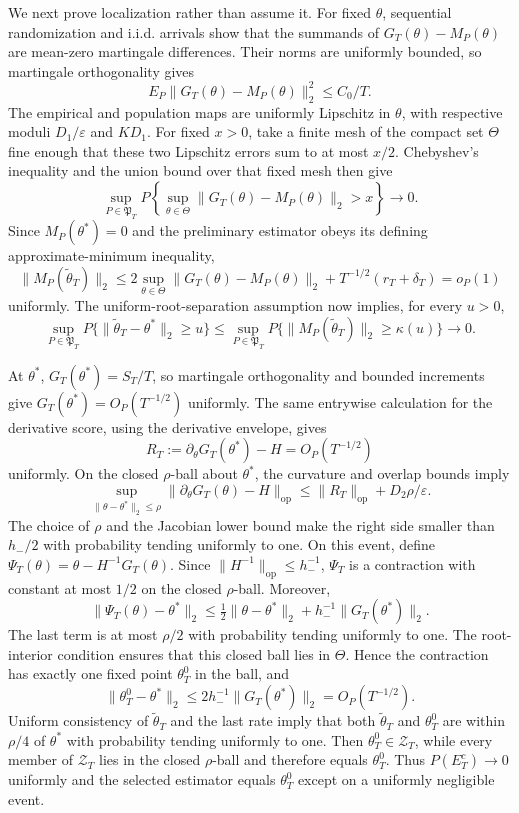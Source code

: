 We next prove localization rather than assume it. For fixed \(\theta\), sequential randomization and i.i.d. arrivals show that the summands of \(G_T(\theta)-M_P(\theta)\) are mean-zero martingale differences. Their norms are uniformly bounded, so martingale orthogonality gives
\[
 E_P\|G_T(\theta)-M_P(\theta)\|_2^2\le C_0/T.
\]
The empirical and population maps are uniformly Lipschitz in \(\theta\), with respective moduli \(D_1/\varepsilon\) and \(KD_1\). For fixed \(x>0\), take a finite mesh of the compact set \(\Theta\) fine enough that these two Lipschitz errors sum to at most \(x/2\). Chebyshev's inequality and the union bound over that fixed mesh then give
\[
 \sup_{P\in\mathfrak P_T}P\left\{\sup_{\theta\in\Theta}
 \|G_T(\theta)-M_P(\theta)\|_2>x\right\}\longrightarrow0.
\]
Since \(M_P(\theta^*)=0\) and the preliminary estimator obeys its defining approximate-minimum inequality,
\[
 \|M_P(\widetilde\theta_T)\|_2
 \le2\sup_{\theta\in\Theta}\|G_T(\theta)-M_P(\theta)\|_2
 +T^{-1/2}(r_T+\delta_T)=o_P(1)
\]
uniformly. The uniform-root-separation assumption now implies, for every \(u>0\),
\[
 \sup_{P\in\mathfrak P_T}P\{\|\widetilde\theta_T-\theta^*\|_2\ge u\}
 \le\sup_{P\in\mathfrak P_T}P\{\|M_P(\widetilde\theta_T)\|_2\ge\kappa(u)\}
 \longrightarrow0.
\]

At \(\theta^*\), \(G_T(\theta^*)=S_T/T\), so martingale orthogonality and bounded increments give \(G_T(\theta^*)=O_P(T^{-1/2})\) uniformly. The same entrywise calculation for the derivative score, using the derivative envelope, gives
\[
 R_T:=\partial_\theta G_T(\theta^*)-H=O_P(T^{-1/2})
\]
uniformly. On the closed \(\rho\)-ball about \(\theta^*\), the curvature and overlap bounds imply
\[
 \sup_{\|\theta-\theta^*\|_2\le\rho}
 \|\partial_\theta G_T(\theta)-H\|_{\mathrm{op}}
 \le\|R_T\|_{\mathrm{op}}+D_2\rho/\varepsilon.
\]
The choice of \(\rho\) and the Jacobian lower bound make the right side smaller than \(h_-/2\) with probability tending uniformly to one. On this event, define \(\Psi_T(\theta)=\theta-H^{-1}G_T(\theta)\). Since \(\|H^{-1}\|_{\mathrm{op}}\le h_-^{-1}\), \(\Psi_T\) is a contraction with constant at most \(1/2\) on the closed \(\rho\)-ball. Moreover,
\[
 \|\Psi_T(\theta)-\theta^*\|_2
 \le\tfrac12\|\theta-\theta^*\|_2+h_-^{-1}\|G_T(\theta^*)\|_2.
\]
The last term is at most \(\rho/2\) with probability tending uniformly to one. The root-interior condition ensures that this closed ball lies in \(\Theta\). Hence the contraction has exactly one fixed point \(\theta_T^0\) in the ball, and
\[
 \|\theta_T^0-\theta^*\|_2
 \le2h_-^{-1}\|G_T(\theta^*)\|_2=O_P(T^{-1/2}).
\]
Uniform consistency of \(\widetilde\theta_T\) and the last rate imply that both \(\widetilde\theta_T\) and \(\theta_T^0\) are within \(\rho/4\) of \(\theta^*\) with probability tending uniformly to one. Then \(\theta_T^0\in\mathcal Z_T\), while every member of \(\mathcal Z_T\) lies in the closed \(\rho\)-ball and therefore equals \(\theta_T^0\). Thus \(P(E_T^c)\to0\) uniformly and the selected estimator equals \(\theta_T^0\) except on a uniformly negligible event.

